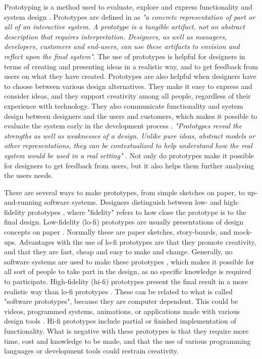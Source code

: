 Prototyping is a method used to evaluate, explore and express functionality and system design \cite{houde1997prototypes}. Prototypes are defined in \cite{mackayprototyping} as \emph{"a concrete representation of part or all of an interactive system. A prototype is a tangible artifact, not an abstract description that requires interpretation. Designers, as well as managers, developers, customers and end-users, can use these artifacts to envision and reflect upon the final system"}. The use of prototypes is helpful for designers in terms of creating and presenting ideas in a realistic way, and to get feedback from users on what they have created. Prototypes are also helpful when designers have to choose between various design alternatives. They make it easy to express and consider ideas, and they support creativity among all people, regardless of their experience with technology. They also communicate functionality and system design between designers and the users and customers, which makes it possible to evaluate the system early in the development process \cite{mackayprototyping} \cite{mmi}. \emph{"Prototypes reveal the strengths as well as weaknesses of a design. Unlike pure ideas, abstract models or other representations, they can be contextualized to help understand how the real system would be used in a real setting"} \cite{mackayprototyping}. Not only do prototypes make it possible for designers to get feedback from users, but it also helps them further analysing the users needs. 

There are several ways to make prototypes, from simple sketches on paper, to up-and-running software systems. Designers distinguish between low- and high-fidelity prototypes \cite{mackayprototyping} \cite{houde1997prototypes} \cite{mmi}, where "fidelity" refers to how close the prototype is to the final design. Low-fidelity (lo-fi) prototypes are usually presentations of design concepts on paper \cite{mmi} \cite{lofihifi}. Normally these are paper sketches, story-boards, and mock-ups. Advantages with the use of lo-fi prototypes are that they promote creativity, and that they are fast, cheap and easy to make and change. Generally, no software systems are used to make these prototypes \cite{lofihifi}, which makes it possible for all sort of people to take part in the design, as no specific knowledge is required to participate. High-fidelity (hi-fi) prototypes present the final result in a more realistic way than lo-fi prototypes \cite{mmi}. These can be related to what is called "software prototypes", because they are computer dependent. This could be videos, programmed systems, animations, or applications made with various design tools \cite{mackayprototyping}. Hi-fi prototypes include partial or finished implementation of functionality. What is negative with these prototypes is that they require more time, cost and knowledge to be made, and that the use of various programming languages or development tools could restrain creativity. 

